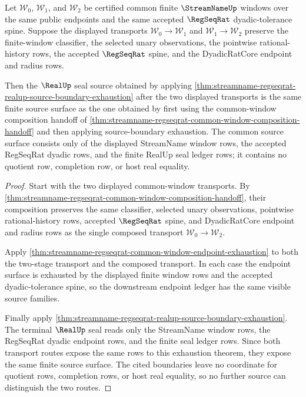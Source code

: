 \begin{theorem}
\label{thm:streamname-regseqrat-common-window-seal-functoriality}
Let $\mathcal W_0$, $\mathcal W_1$, and $\mathcal W_2$ be certified common
finite $\StreamNameUp$ windows over the same public endpoints and the same
accepted $\RegSeqRat$ dyadic-tolerance spine. Suppose the displayed transports
$\mathcal W_0 \to \mathcal W_1$ and $\mathcal W_1 \to \mathcal W_2$ preserve
the finite-window classifier, the selected unary observations, the pointwise
rational-history rows, the accepted $\RegSeqRat$ spine, and the DyadicRatCore
endpoint and radius rows.

Then the $\RealUp$ seal source obtained by applying
\autoref{thm:streamname-regseqrat-realup-source-boundary-exhaustion} after the
two displayed transports is the same finite source surface as the one obtained
by first using the common-window composition handoff of
\autoref{thm:streamname-regseqrat-common-window-composition-handoff} and then
applying source-boundary exhaustion. The common source surface consists only of
the displayed StreamName window rows, the accepted RegSeqRat dyadic rows, and
the finite RealUp seal ledger rows; it contains no quotient row, completion
row, or host real equality.
\end{theorem}
\begin{proof}
Start with the two displayed common-window transports. By
\autoref{thm:streamname-regseqrat-common-window-composition-handoff}, their
composition preserves the same classifier, selected unary observations,
pointwise rational-history rows, accepted $\RegSeqRat$ spine, and DyadicRatCore
endpoint and radius rows as the single composed transport
$\mathcal W_0 \to \mathcal W_2$.

Apply
\autoref{thm:streamname-regseqrat-common-window-endpoint-exhaustion} to both
the two-stage transport and the composed transport. In each case the endpoint
surface is exhausted by the displayed finite window rows and the accepted
dyadic-tolerance spine, so the downstream endpoint ledger has the same visible
source families.

Finally apply
\autoref{thm:streamname-regseqrat-realup-source-boundary-exhaustion}. The
terminal $\RealUp$ seal reads only the StreamName window rows, the RegSeqRat
dyadic endpoint rows, and the finite seal ledger rows. Since both transport
routes expose the same rows to this exhaustion theorem, they expose the same
finite source surface. The cited boundaries leave no coordinate for quotient
rows, completion rows, or host real equality, so no further source can
distinguish the two routes.
\end{proof}


